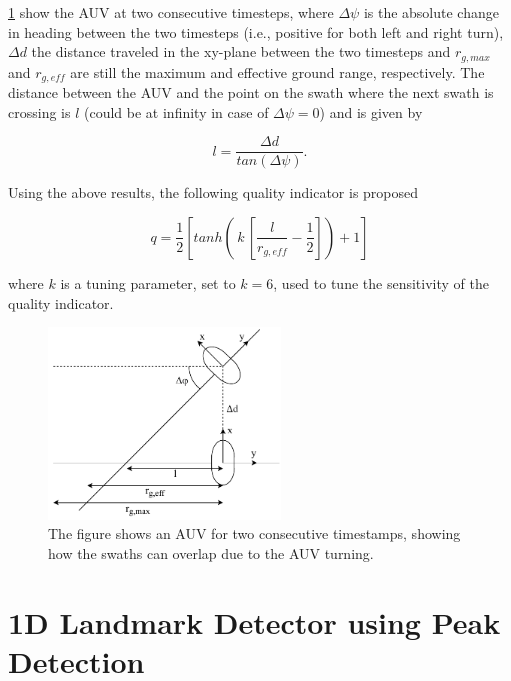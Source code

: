 \cref{fig:quality_ind} show the AUV at two consecutive timesteps, where $\Delta \psi$ is the absolute change in heading between the two timesteps (i.e., positive for both left and right turn), $\Delta d$ the distance traveled in the xy-plane between the two timesteps and $r_{g, max}$ and $r_{g, eff}$ are still the maximum and effective ground range, respectively. The distance between the AUV and the point on the swath where the next swath is crossing is $l$ (could be at infinity in case of $\Delta \psi = 0$) and is given by

\begin{equation}
    l = \frac{\Delta d}{tan(\Delta \psi)}.
    \label{eq:l_qi}
\end{equation}

Using the above results, the following quality indicator is proposed

\begin{equation}
    q = \frac{1}{2}[tanh( \,k\, [\frac{l}{r_{g, eff}} - \frac{1}{2}]) + 1]
\end{equation}

where $k$ is a tuning parameter, set to $k = 6$, used to tune the sensitivity of the quality indicator. 

\begin{figure}
    \centering
    \includegraphics[width=0.55\textwidth]{figures/quality_ind.drawio.pdf}
    \caption{The figure shows an AUV for two consecutive timestamps, showing how the swaths can overlap due to the AUV turning.}
    \label{fig:quality_ind}
\end{figure}

\section{1D Landmark Detector using Peak Detection}

